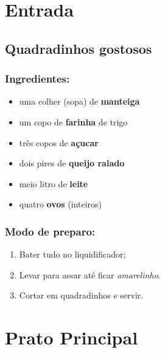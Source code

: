\documentclass{report}
\begin{document}
\chapter{Entrada}

\section{Quadradinhos gostosos}

 
\subsection{Ingredientes:}

\begin{itemize}
\item uma colher (sopa) de \textbf{manteiga}


\item um copo de \textbf{farinha} de trigo


\item três copos de \textbf{açucar}


\item dois pires de \textbf{queijo ralado}


\item meio litro de \textbf{leite}


\item quatro \textbf{ovos} (inteiros)

\end{itemize}
 
\subsection{Modo de preparo:}

\begin{enumerate}

\item Bater tudo no liquidificador;

\item Levar para assar até ficar \textit{amarelinho}. 

\item Cortar em quadradinhos e servir.

\end{enumerate}



\newpage

\chapter{Prato Principal}
\end{document}
